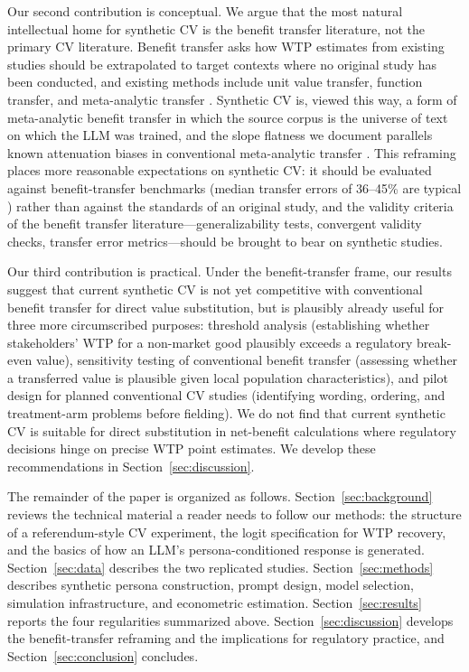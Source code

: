 \documentclass[12pt]{article}
\begin{document}
Our second contribution is conceptual. We argue that the most natural
intellectual home for synthetic CV is the benefit transfer literature, not
the primary CV literature. Benefit transfer asks how WTP estimates from
existing studies should be extrapolated to target contexts where no original
study has been conducted, and existing methods include unit value transfer,
function transfer, and meta-analytic transfer
\parencite{Rosenberger2017, Loomis2015, Boyle2010}. Synthetic CV is, viewed
this way, a form of meta-analytic benefit transfer in which the source
corpus is the universe of text on which the LLM was trained, and the slope
flatness we document parallels known attenuation biases in conventional
meta-analytic transfer \parencite{Bergstrom2008}. This reframing places more
reasonable expectations on synthetic CV: it should be evaluated against
benefit-transfer benchmarks (median transfer errors of 36--45\% are
typical \parencite{Rosenberger2017}) rather than against the standards of an original study, and the
validity criteria of the benefit transfer literature---generalizability
tests, convergent validity checks, transfer error metrics---should be
brought to bear on synthetic studies.

Our third contribution is practical. Under the benefit-transfer frame, our
results suggest that current synthetic CV is not yet competitive with
conventional benefit transfer for direct value substitution, but is
plausibly already useful for three more circumscribed purposes: threshold
analysis (establishing whether stakeholders' WTP for a non-market good
plausibly exceeds a regulatory break-even value), sensitivity testing of
conventional benefit transfer (assessing whether a transferred value is
plausible given local population characteristics), and pilot design for
planned conventional CV studies (identifying wording, ordering, and
treatment-arm problems before fielding). We do not find that current
synthetic CV is suitable for direct substitution in net-benefit calculations
where regulatory decisions hinge on precise WTP point estimates. We develop
these recommendations in Section~\ref{sec:discussion}.

The remainder of the paper is organized as follows.
Section~\ref{sec:background} reviews the technical material a reader needs
to follow our methods: the structure of a referendum-style CV experiment,
the logit specification for WTP recovery, and the basics of how an LLM's
persona-conditioned response is generated. Section~\ref{sec:data} describes
the two replicated studies. Section~\ref{sec:methods} describes synthetic
persona construction, prompt design, model selection, simulation
infrastructure, and econometric estimation. Section~\ref{sec:results}
reports the four regularities summarized above. Section~\ref{sec:discussion}
develops the benefit-transfer reframing and the implications for regulatory
practice, and Section~\ref{sec:conclusion} concludes.
\end{document}
